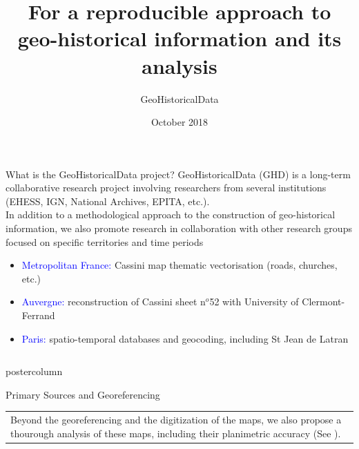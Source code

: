 \documentclass[final,hyperref={pdfpagelabels=false}]{beamer}
\title{For a reproducible approach to geo-historical information and its analysis}
\author{GeoHistoricalData}
\institute{GeoHistoricalData Research Group}
\date{October 2018}
\let\oldcite=\cite
\renewcommand{\cite}[1]{\textcolor{ta3chameleon}{\oldcite{#1}}}
\begin{document}
\begin{frame}
  \begin{block}{What is the GeoHistoricalData project?}
    \textcolor{ta3orange}{GeoHistoricalData} (GHD) is a long-term collaborative research project involving researchers from several institutions (EHESS, IGN, National Archives, EPITA, etc.).\\
    In addition to a methodological approach to the construction of geo-historical information, we also promote research in collaboration with other research groups focused on specific territories and time periods
    \begin{itemize}
    \item \textcolor{blue}{Metropolitan France:} Cassini map thematic vectorisation (roads, churches, etc.)
    \item \textcolor{blue}{Auvergne:} \textcolor{ta3orange}{reconstruction of Cassini sheet n$^{o}$52} with University of Clermont-Ferrand
    \item \textcolor{blue}{Paris:} spatio-temporal databases and geocoding, including \textcolor{ta3orange}{St Jean de Latran}~\cite{Rebolledo-Dhuin2014}
    \end{itemize}
  \end{block}
  \begin{columns}
    \begin{column}{0.5\textwidth}
    \begin{beamercolorbox}[center,wd=\textwidth]{postercolumn}
    \begin{minipage}[t]{.98\textwidth}
    \renewcommand{\footnoterule}{}
    \begin{block}{Primary Sources and Georeferencing}
      \begin{tabular}{p{}p{}}
        \multicolumn{2}{p{0.9\textwidth}}{Beyond the georeferencing and the digitization of the maps, we also propose a thourough analysis of these maps, including their planimetric accuracy (See \cite{Dumenieu2013a,Dumenieu2015PhD,Dumenieu2018}).}\\

\end{tabular}
\end{block}
\end{minipage}
\end{beamercolorbox}
\end{column}
\end{columns}
\end{frame}
\end{document}
